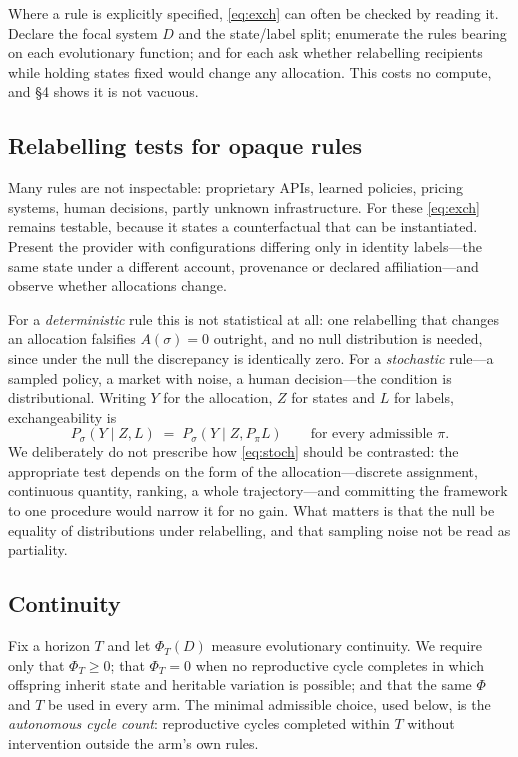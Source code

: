 \documentclass[review,3p,times]{elsarticle}
\begin{document}
Where a rule is explicitly specified, \eqref{eq:exch} can often be checked
by reading it. Declare the focal system $D$ and the state/label split;
enumerate the rules bearing on each evolutionary function; and for each ask
whether relabelling recipients while holding states fixed would change any
allocation. This costs no compute, and \S4 shows it is not vacuous.

\subsection{Relabelling tests for opaque rules}

Many rules are not inspectable: proprietary APIs, learned policies, pricing
systems, human decisions, partly unknown infrastructure. For these
\eqref{eq:exch} remains testable, because it states a counterfactual that can
be instantiated. Present the provider with configurations differing only in
identity labels---the same state under a different account, provenance or
declared affiliation---and observe whether allocations change.

For a \emph{deterministic} rule this is not statistical at all: one
relabelling that changes an allocation falsifies $A(\sigma)=0$ outright, and
no null distribution is needed, since under the null the discrepancy is
identically zero. For a \emph{stochastic} rule---a sampled policy, a market
with noise, a human decision---the condition is distributional. Writing $Y$
for the allocation, $Z$ for states and $L$ for labels, exchangeability is
\begin{equation}
P_\sigma\!\left(Y \mid Z, L\right)
\;=\;
P_\sigma\!\left(Y \mid Z, P_\pi L\right)
\qquad \text{for every admissible } \pi .
\label{eq:stoch}
\end{equation}
We deliberately do not prescribe how \eqref{eq:stoch} should be contrasted:
the appropriate test depends on the form of the allocation---discrete
assignment, continuous quantity, ranking, a whole trajectory---and committing
the framework to one procedure would narrow it for no gain. What matters is
that the null be equality of distributions under relabelling, and that
sampling noise not be read as partiality.

\subsection{Continuity}

Fix a horizon $T$ and let $\Phi_T(D)$ measure evolutionary continuity. We
require only that $\Phi_T\geq 0$; that $\Phi_T=0$ when no reproductive
cycle completes in which offspring inherit state and heritable variation is
possible; and that the same $\Phi$ and $T$ be used in every arm. The
minimal admissible choice, used below, is the \emph{autonomous cycle
count}: reproductive cycles completed within $T$ without intervention
outside the arm's own rules.
\end{document}
